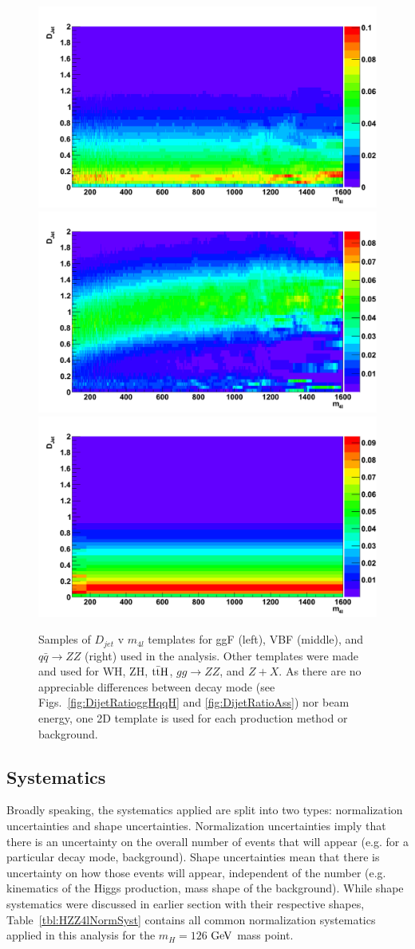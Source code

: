 \begin{figure}[htbp]
\begin{center}
\includegraphics[width=.3\linewidth]{HiggsDiscovery/figures/ggH_Fisher_2D.png}
\includegraphics[width=.3\linewidth]{HiggsDiscovery/figures/qqH_Fisher_2D.png}
\includegraphics[width=.3\linewidth]{HiggsDiscovery/figures/qqZZ_Fisher_2D.png} \\
\caption[Templates of $D_jet$ for Signals and Background]{Samples of $D_{jet}$ v $m_{4l}$ templates for ggF (left), VBF (middle), and $q\bar{q}\rightarrow ZZ$ (right) used in the analysis. Other templates were made and used for WH, ZH, $\rm{t\bar{t}H}$, $gg\rightarrow ZZ$, and $Z+X$. As there are no appreciable differences between decay mode (see Figs.~\ref{fig:DijetRatioggHqqH} and \ref{fig:DijetRatioAss}) nor beam energy, one 2D template is used for each production method or background.}
\label{fig:FisherTemplates}
\end{center}
\end{figure}

\subsection{Systematics}
\label{sec:ZZ4lSystematics}

Broadly speaking, the systematics applied are split into two types: normalization uncertainties and shape uncertainties. Normalization uncertainties imply that there is an uncertainty on the overall number of events that will appear (e.g. for a particular decay mode, background). Shape uncertainties mean that there is uncertainty on how those events will appear, independent of the number (e.g. kinematics of the Higgs production, mass shape of the background). While shape systematics were discussed in earlier section with their respective shapes, Table~\ref{tbl:HZZ4lNormSyst} contains all common normalization systematics applied in this analysis for the $m_H = 126$ $\rm{GeV}$ mass point.

